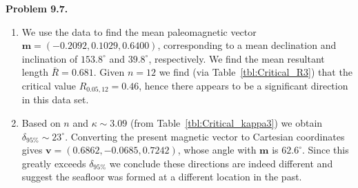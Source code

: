 \noindent
\bf{Problem 9.7.} \\

\begin{enumerate}[label=\alph*)]
\item We use the data to find the mean paleomagnetic vector
$\mathbf{m} = (-0.2092, 0.1029, 0.6400)$, corresponding to a mean declination and inclination of $153.8^{\circ}$ and $39.8^{\circ}$,
respectively.  We find the mean resultant length $\bar{R} = 0.681$.  Given $n = 12$ we find (via Table~\ref{tbl:Critical_R3}) that
the critical value $R_{0.05,12} = 0.46$, hence there appears to be a significant direction in this data set.

\item Based on $n$ and $\kappa \sim 3.09$ (from Table~\ref{tbl:Critical_kappa3}) we obtain $\delta_{95\%} \sim 23^{\circ}$.
Converting the present magnetic vector to Cartesian coordinates gives $\mathbf{v} = (0.6862, -0.0685, 0.7242)$, whose
angle with $\mathbf{m}$ is $62.6^{\circ}$. Since this greatly exceeds $\delta_{95\%}$ we conclude these directions are indeed
different and suggest the seafloor was formed at a different location in the past.
\end{enumerate}
